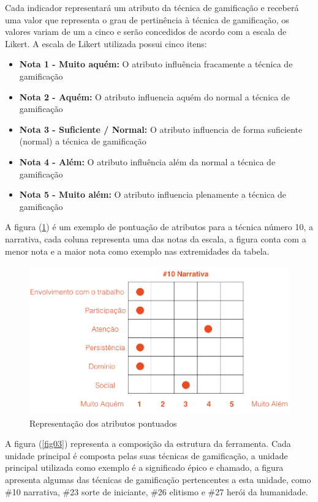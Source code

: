 Cada indicador representará um atributo da técnica de gamificação e receberá uma valor que representa o grau de pertinência à técnica de gamificação, os valores variam de um a cinco e serão concedidos de acordo com a escala de Likert. A escala de Likert utilizada possui cinco itens: 

\begin{itemize}
\item  \textbf {Nota 1 - Muito aquém:} O atributo influência fracamente a técnica de gamificação
\item  \textbf {Nota 2 - Aquém:} O atributo influencia aquém do normal a técnica de gamificação
\item  \textbf {Nota 3 - Suficiente / Normal:} O atributo influencia de forma suficiente (normal) a técnica de gamificação
\item  \textbf {Nota 4 - Além:} O atributo influência além da normal a técnica de gamificação
\item  \textbf {Nota 5 - Muito além:} O atributo influencia plenamente a técnica de gamificação
\end{itemize}


A figura (\ref{fig02}) é um exemplo de pontuação de atributos para a técnica número 10, a narrativa, cada coluna representa uma das notas da escala, a figura conta com a menor nota e a maior nota como exemplo nas extremidades da tabela.

\begin{figure}[h]
	\centering
		\includegraphics[keepaspectratio=true,scale=0.5]{figuras/notas.png}
	\caption{Representação dos atributos pontuados\label{fig02}}
\end{figure}

\newpage


A figura (\ref{fig03}) representa a composição da estrutura da ferramenta. Cada unidade principal é composta pelas suas técnicas de gamificação, a unidade principal utilizada como exemplo é a significado épico e chamado, a figura apresenta algumas das técnicas de gamificação pertencentes a esta unidade, como \#10 narrativa, \#23 sorte de iniciante, \#26 elitismo e \#27 herói da humanidade. 

